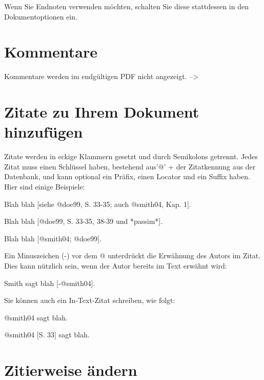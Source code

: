 \documentclass[12pt,de-CH,twoside,openright]{report}
\newenvironment{Shaded}{\begin{snugshade}}{\end{snugshade}}
\newcommand{\NormalTok}[1]{#1}
\begin{document}
Wenn Sie Endnoten verwenden möchten, schalten Sie diese stattdessen in
den Dokumentoptionen ein.

\hypertarget{kommentare}{%
\section{Kommentare}\label{kommentare}}

\begin{Shaded}
\begin{Highlighting}[]
\NormalTok{Kommentare werden im endgültigen PDF nicht angezeigt. -->}
\end{Highlighting}
\end{Shaded}

\hypertarget{zitate-zu-ihrem-dokument-hinzufugen}{%
\section{Zitate zu Ihrem Dokument
hinzufügen}\label{zitate-zu-ihrem-dokument-hinzufugen}}

\begin{Shaded}
\begin{Highlighting}[]
\NormalTok{Zitate werden in eckige Klammern gesetzt und durch Semikolons getrennt. Jedes Zitat muss einen Schlüssel haben, bestehend aus'@' + der Zitatkennung aus der Datenbank, und kann optional ein Präfix, einen Locator und ein Suffix haben. Hier sind einige Beispiele:}

\NormalTok{Blah blah [siehe @doe99, S. 33-35; auch @smith04, Kap. 1].}

\NormalTok{Blah blah [@doe99, S. 33-35, 38-39 und *passim*].}

\NormalTok{Blah blah [@smith04; @doe99].}

\NormalTok{Ein Minuszeichen (-) vor dem @ unterdrückt die Erwähnung des Autors im Zitat. Dies kann nützlich sein, wenn der Autor bereits im Text erwähnt wird:}

\NormalTok{Smith sagt blah [-@smith04].}

\NormalTok{Sie können auch ein In-Text-Zitat schreiben, wie folgt:}

\NormalTok{@smith04 sagt blah.}

\NormalTok{@smith04 [S. 33] sagt blah.}
\end{Highlighting}
\end{Shaded}

\hypertarget{zitierweise-andern}{%
\section{Zitierweise ändern}\label{zitierweise-andern}}
\end{document}
